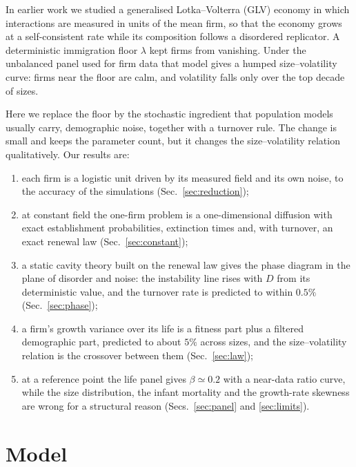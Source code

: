 \documentclass[pre,twocolumn,superscriptaddress,nofootinbib]{revtex4-2}
\begin{document}
In earlier work we studied a generalised Lotka--Volterra (GLV) economy in which interactions are
measured in units of the mean firm, so that the economy grows at a self-consistent rate while
its composition follows a disordered replicator.  A deterministic immigration floor $\lambda$
kept firms from vanishing.  Under the unbalanced panel used for firm data that model gives a
humped size--volatility curve: firms near the floor are calm, and volatility falls only over the
top decade of sizes.

Here we replace the floor by the stochastic ingredient that population models usually carry,
demographic noise, together with a turnover rule.  The change is small and keeps the parameter
count, but it changes the size--volatility relation qualitatively.  Our results are:
\begin{enumerate}
\item each firm is a logistic unit driven by its measured field and its own noise, to the
  accuracy of the simulations (Sec.~\ref{sec:reduction});
\item at constant field the one-firm problem is a one-dimensional diffusion with exact
  establishment probabilities, extinction times and, with turnover, an exact renewal law
  (Sec.~\ref{sec:constant});
\item a static cavity theory built on the renewal law gives the phase diagram in the plane of
  disorder and noise: the instability line rises with $D$ from its deterministic value, and the
  turnover rate is predicted to within $0.5\%$ (Sec.~\ref{sec:phase});
\item a firm's growth variance over its life is a fitness part plus a filtered demographic part,
  predicted to about $5\%$ across sizes, and the size--volatility relation is the crossover
  between them (Sec.~\ref{sec:law});
\item at a reference point the life panel gives $\beta\simeq0.2$ with a near-data ratio curve, while
  the size distribution, the infant mortality and the growth-rate skewness are wrong for a
  structural reason (Secs.~\ref{sec:panel} and \ref{sec:limits}).
\end{enumerate}

\section{Model}
\label{sec:model}
\end{document}
